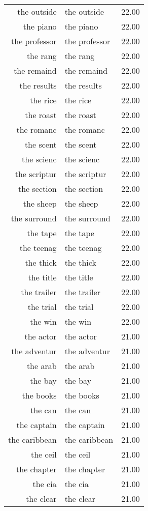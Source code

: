 \begin{table}[ht]
\begin{tabular}{rlr}
  the outside & the outside & 22.00 \\ 
  the piano & the piano & 22.00 \\ 
  the professor & the professor & 22.00 \\ 
  the rang & the rang & 22.00 \\ 
  the remaind & the remaind & 22.00 \\ 
  the results & the results & 22.00 \\ 
  the rice & the rice & 22.00 \\ 
  the roast & the roast & 22.00 \\ 
  the romanc & the romanc & 22.00 \\ 
  the scent & the scent & 22.00 \\ 
  the scienc & the scienc & 22.00 \\ 
  the scriptur & the scriptur & 22.00 \\ 
  the section & the section & 22.00 \\ 
  the sheep & the sheep & 22.00 \\ 
  the surround & the surround & 22.00 \\ 
  the tape & the tape & 22.00 \\ 
  the teenag & the teenag & 22.00 \\ 
  the thick & the thick & 22.00 \\ 
  the title & the title & 22.00 \\ 
  the trailer & the trailer & 22.00 \\ 
  the trial & the trial & 22.00 \\ 
  the win & the win & 22.00 \\ 
  the actor & the actor & 21.00 \\ 
  the adventur & the adventur & 21.00 \\ 
  the arab & the arab & 21.00 \\ 
  the bay & the bay & 21.00 \\ 
  the books & the books & 21.00 \\ 
  the can & the can & 21.00 \\ 
  the captain & the captain & 21.00 \\ 
  the caribbean & the caribbean & 21.00 \\ 
  the ceil & the ceil & 21.00 \\ 
  the chapter & the chapter & 21.00 \\ 
  the cia & the cia & 21.00 \\ 
  the clear & the clear & 21.00 \\ 

\end{tabular}
\end{table}
